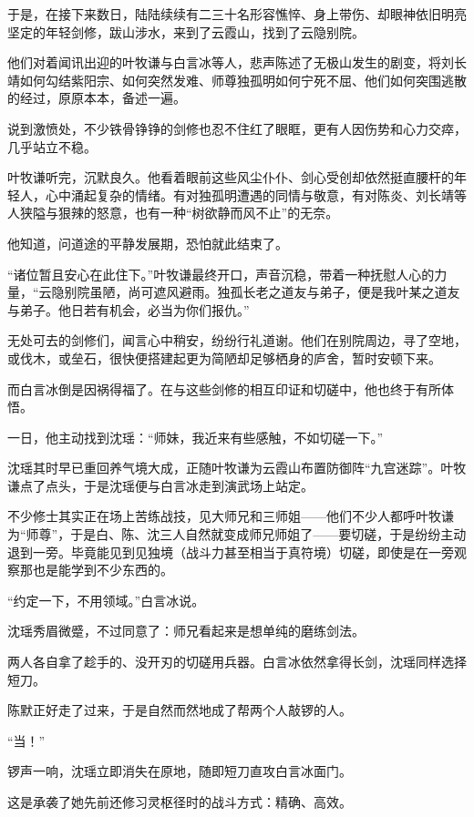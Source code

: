 于是，在接下来数日，陆陆续续有二三十名形容憔悴、身上带伤、却眼神依旧明亮坚定的年轻剑修，跋山涉水，来到了云霞山，找到了云隐别院。

他们对着闻讯出迎的叶牧谦与白言冰等人，悲声陈述了无极山发生的剧变，将刘长靖如何勾结紫阳宗、如何突然发难、师尊独孤明如何宁死不屈、他们如何突围逃散的经过，原原本本，备述一遍。

说到激愤处，不少铁骨铮铮的剑修也忍不住红了眼眶，更有人因伤势和心力交瘁，几乎站立不稳。

叶牧谦听完，沉默良久。他看着眼前这些风尘仆仆、剑心受创却依然挺直腰杆的年轻人，心中涌起复杂的情绪。有对独孤明遭遇的同情与敬意，有对陈炎、刘长靖等人狭隘与狠辣的怒意，也有一种“树欲静而风不止”的无奈。

他知道，问道途的平静发展期，恐怕就此结束了。

“诸位暂且安心在此住下。”叶牧谦最终开口，声音沉稳，带着一种抚慰人心的力量，“云隐别院虽陋，尚可遮风避雨。独孤长老之道友与弟子，便是我叶某之道友与弟子。他日若有机会，必当为你们报仇。”

无处可去的剑修们，闻言心中稍安，纷纷行礼道谢。他们在别院周边，寻了空地，或伐木，或垒石，很快便搭建起更为简陋却足够栖身的庐舍，暂时安顿下来。

\vspace{2em}

而白言冰倒是因祸得福了。在与这些剑修的相互印证和切磋中，他也终于有所体悟。

一日，他主动找到沈瑶：“师妹，我近来有些感触，不如切磋一下。”

沈瑶其时早已重回养气境大成，正随叶牧谦为云霞山布置防御阵“九宫迷踪”。叶牧谦点了点头，于是沈瑶便与白言冰走到演武场上站定。

不少修士其实正在场上苦练战技，见大师兄和三师姐——他们不少人都呼叶牧谦为“师尊”，于是白、陈、沈三人自然就变成师兄师姐了——要切磋，于是纷纷主动退到一旁。毕竟能见到见独境（战斗力甚至相当于真符境）切磋，即使是在一旁观察那也是能学到不少东西的。

“约定一下，不用领域。”白言冰说。

沈瑶秀眉微蹙，不过同意了：师兄看起来是想单纯的磨练剑法。

两人各自拿了趁手的、没开刃的切磋用兵器。白言冰依然拿得长剑，沈瑶同样选择短刀。

陈默正好走了过来，于是自然而然地成了帮两个人敲锣的人。

“当！”

锣声一响，沈瑶立即消失在原地，随即短刀直攻白言冰面门。

这是承袭了她先前还修习灵枢径时的战斗方式：精确、高效。

